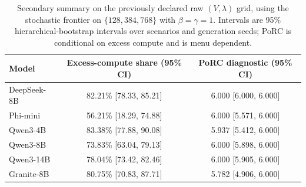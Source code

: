 \begin{table}[H]
\centering
\caption{Secondary summary on the previously declared raw $(V,\lambda)$ grid, using the stochastic frontier on $\{128,384,768\}$ with $\beta=\gamma=1$. Intervals are 95\% hierarchical-bootstrap intervals over scenarios and generation seeds; PoRC is conditional on excess compute and is menu dependent.}
\label{tab:game}
\small
\setlength{\tabcolsep}{4pt}
\begin{tabular}{lcc}
\toprule
Model & Excess-compute share (95\% CI) & PoRC diagnostic (95\% CI) \\
\midrule
DeepSeek-8B & 82.21\% [78.33, 85.21] & 6.000 [6.000, 6.000] \\
Phi-mini & 56.21\% [18.29, 74.88] & 6.000 [5.571, 6.000] \\
Qwen3-4B & 83.38\% [77.88, 90.08] & 5.937 [5.412, 6.000] \\
Qwen3-8B & 73.83\% [63.04, 79.13] & 6.000 [5.898, 6.000] \\
Qwen3-14B & 78.04\% [73.42, 82.46] & 6.000 [5.905, 6.000] \\
Granite-8B & 80.75\% [70.83, 87.71] & 5.782 [4.906, 6.000] \\
\bottomrule
\end{tabular}
\end{table}
